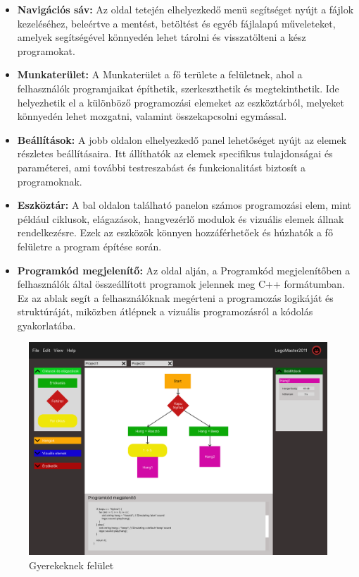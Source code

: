 \documentclass{article}
\begin{document}
\begin{itemize}
\item \textbf{Navigációs sáv:} 
Az oldal tetején elhelyezkedő menü segítséget nyújt a fájlok kezeléséhez, beleértve a mentést, betöltést és egyéb fájlalapú műveleteket, amelyek segítségével könnyedén lehet tárolni és visszatölteni a kész programokat.
\item \textbf{Munkaterület:}
A Munkaterület a fő területe a felületnek, ahol a felhasználók programjaikat építhetik, szerkeszthetik és megtekinthetik. Ide helyezhetik el a különböző programozási elemeket az eszköztárból, melyeket könnyedén lehet mozgatni, valamint összekapcsolni egymással.
\item \textbf{Beállítások:} 
A jobb oldalon elhelyezkedő panel lehetőséget nyújt az elemek részletes beállításaira. Itt állíthatók az elemek specifikus tulajdonságai és paraméterei, ami további testreszabást és funkcionalitást biztosít a programoknak.
\item \textbf{Eszköztár:}
A bal oldalon található panelon számos programozási elem, mint például ciklusok, elágazások, hangvezérlő modulok és vizuális elemek állnak rendelkezésre. Ezek az eszközök könnyen hozzáférhetőek és húzhatók a fő felületre a program építése során.
\item \textbf{Programkód megjelenítő:}
Az oldal alján, a Programkód megjelenítőben a felhasználók által összeállított programok jelennek meg C++ formátumban. Ez az ablak segít a felhasználóknak megérteni a programozás logikáját és struktúráját, miközben átlépnek a vizuális programozásról a kódolás gyakorlatába.
\end{itemize}

\begin{figure}[!h]
\centering
\includegraphics[width=1\linewidth]{gyerekeknek-felulet.png}
\caption{\label{fig:image}Gyerekeknek felület}
\end{figure}
\end{document}
